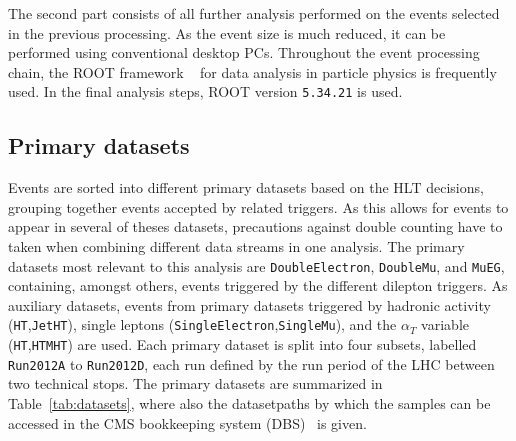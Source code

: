 The second part consists of all further analysis performed on the events selected in the previous processing. As the event size is much reduced, it can be performed using conventional desktop PCs. Throughout the event processing chain, the ROOT framework ~\cite{ROOT} for data analysis in particle physics is frequently used. In the final analysis steps, ROOT version \verb+5.34.21+ is used.  

\subsection{Primary datasets}

Events are sorted into different primary datasets based on the HLT decisions, grouping together events accepted by related triggers. As this allows for events to appear in several of theses datasets, precautions against double counting have to taken when combining different data streams in one analysis. The primary datasets most relevant to this analysis are \verb+DoubleElectron+, \verb+DoubleMu+, and \verb+MuEG+, containing, amongst others, events triggered by the different dilepton triggers. As auxiliary datasets, events from primary datasets triggered by hadronic activity (\verb+HT+,\verb+JetHT+), single leptons (\verb+SingleElectron+,\verb+SingleMu+), and the $\alpha_T$ variable (\verb+HT+,\verb+HTMHT+) are used. Each primary dataset is split into four subsets, labelled \verb+Run2012A+ to \verb+Run2012D+, each run defined by the run period of the LHC between two technical stops. The primary datasets are summarized in Table~\ref{tab:datasets}, where also the datasetpaths by which the samples can be accessed in the CMS bookkeeping system (DBS)~\cite{1742-6596-119-7-072001} is given.   

